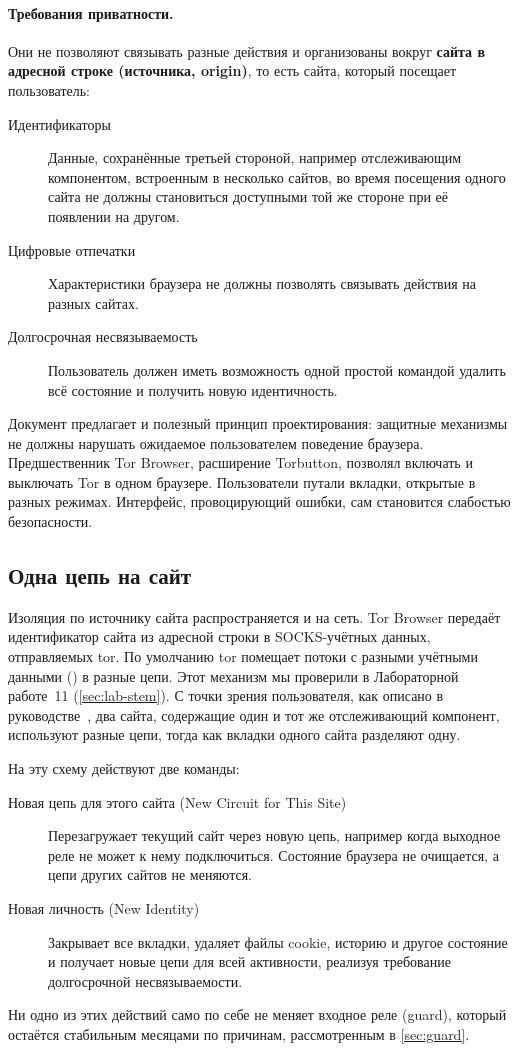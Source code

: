 \paragraph{Требования приватности.} Они не позволяют связывать разные действия и организованы вокруг \textbf{сайта в адресной строке (источника, origin)}, то есть сайта, который посещает пользователь:
\begin{description}
  \item[Идентификаторы] Данные, сохранённые третьей стороной, например отслеживающим компонентом, встроенным в несколько сайтов, во время посещения одного сайта не должны становиться доступными той же стороне при её появлении на другом.
  \item[Цифровые отпечатки] Характеристики браузера не должны позволять связывать действия на разных сайтах.
  \item[Долгосрочная несвязываемость] Пользователь должен иметь возможность одной простой командой удалить всё состояние и получить новую идентичность.
\end{description}
Документ предлагает и полезный принцип проектирования: защитные механизмы не должны нарушать ожидаемое пользователем поведение браузера. Предшественник Tor Browser, расширение Torbutton, позволял включать и выключать Tor в одном браузере. Пользователи путали вкладки, открытые в разных режимах. Интерфейс, провоцирующий ошибки, сам становится слабостью безопасности.

\subsection{Одна цепь на сайт}

Изоляция по источнику сайта распространяется и на сеть. Tor Browser передаёт идентификатор сайта из адресной строки в SOCKS-учётных данных, отправляемых tor. По умолчанию tor помещает потоки с разными учётными данными () в разные цепи. Этот механизм мы проверили в Лабораторной работе~11 (\cref{sec:lab-stem}). С точки зрения пользователя, как описано в руководстве~\cite{tbmanual}, два сайта, содержащие один и тот же отслеживающий компонент, используют разные цепи, тогда как вкладки одного сайта разделяют одну.

На эту схему действуют две команды:
\begin{description}
  \item[Новая цепь для этого сайта (New Circuit for This Site)] Перезагружает текущий сайт через новую цепь, например когда выходное реле не может к нему подключиться. Состояние браузера не очищается, а цепи других сайтов не меняются.
  \item[Новая личность (New Identity)] Закрывает все вкладки, удаляет файлы cookie, историю и другое состояние и получает новые цепи для всей активности, реализуя требование долгосрочной несвязываемости.
\end{description}
Ни одно из этих действий само по себе не меняет входное реле (guard), который остаётся стабильным месяцами по причинам, рассмотренным в \cref{sec:guard}.

